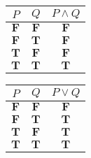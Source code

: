 \documentclass[../main.tex]{subfiles}
\begin{document}
\begin{table}[!hbp]
    \begin{minipage}{.5\linewidth}
        \centering
        \begin{tabular}{c|c||c}
            $P$ & $Q$ & $P\land Q$ \\
            \hline
            $\mathbf{F}$ & $\mathbf{F}$ & $\mathbf{F}$ \\
            $\mathbf{F}$ & $\mathbf{T}$ & $\mathbf{F}$ \\
            $\mathbf{T}$ & $\mathbf{F}$ & $\mathbf{F}$ \\
            $\mathbf{T}$ & $\mathbf{T}$ & $\mathbf{T}$
        \end{tabular}
        \label{tab:first_order_logic:logical_conjuction}
    \end{minipage}%
    \begin{minipage}{.5\linewidth}
        \centering
        \begin{tabular}{c|c||c}
            $P$ & $Q$ & $P\lor Q$ \\
            \hline
            $\mathbf{F}$ & $\mathbf{F}$ & $\mathbf{F}$ \\
            $\mathbf{F}$ & $\mathbf{T}$ & $\mathbf{T}$ \\
            $\mathbf{T}$ & $\mathbf{F}$ & $\mathbf{T}$ \\
            $\mathbf{T}$ & $\mathbf{T}$ & $\mathbf{T}$
        \end{tabular}
        \label{tab:first_order_logic:logical_disjunction}
    \end{minipage}


\end{table}
\end{document}
